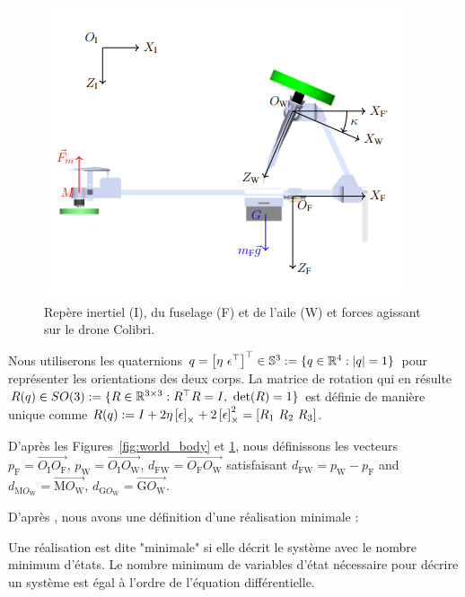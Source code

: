 \begin{figure}[ht!]
    \centering
    \includegraphics[width=0.6\columnwidth,angle=0,trim={0 0 0 0.5cm},clip]{figures/fram_side_colibri.png}
    \caption{Repère inertiel (I), du fuselage (F) et de l'aile (W) et forces agissant sur le drone Colibri.}
    \label{fig:colibri_frame_side}
\end{figure}
Nous utiliserons les quaternions $q = \left[ \eta ~ \epsilon^\top \right]^\top  \in {\mathbb S}^3:=\{ q\in {\mathbb R}^4: |q| = 1\}$ pour représenter les orientations des deux corps. La matrice de rotation qui en résulte $R(q) \in SO(3): = \{R\in {\mathbb R}^{3\times 3}: R^\top R = I,~\det(R)=1\}$ est définie de manière unique comme $R(q) := I +2\eta \left[\epsilon\right]_{\times} + 2\left[\epsilon\right]_{\times}^{2} = [R_{1}~R_{2}~R_{3}]$.

D'après les Figures~\ref{fig:world_body} et \ref{fig:colibri_frame_side}, nous définissons les vecteurs $p_{\text{F}} = \overrightarrow{O_{\text{I}} O_{\text{F}}} $, $p_{\text{W}} = \overrightarrow{O_{\text{I}} O_{\text{W}}} $, $d_{\text{FW}} = \overrightarrow{O_{\text{F}} O_{\text{W}}} $ satisfaisant $d_{\text{FW}} = p_{\text{W}} - p_{\text{F}}$ and $d_{\text{M}O_{\text{W}}} = \overrightarrow{\text{M} O_{\text{W}} }$, $d_{\text{G}O_{\text{W}}} = \overrightarrow{\text{G} O_{\text{W}} }$.

D'après \cite{Tangirala2015}, nous avons une définition d'une réalisation minimale : 
\begin{definition}
    \label{def:reaMini}
    Une réalisation est dite "minimale" si elle décrit le système avec le nombre minimum d'états. Le nombre minimum de variables d'état nécessaire pour décrire un système est égal à l'ordre de l'équation différentielle.
\end{definition}


